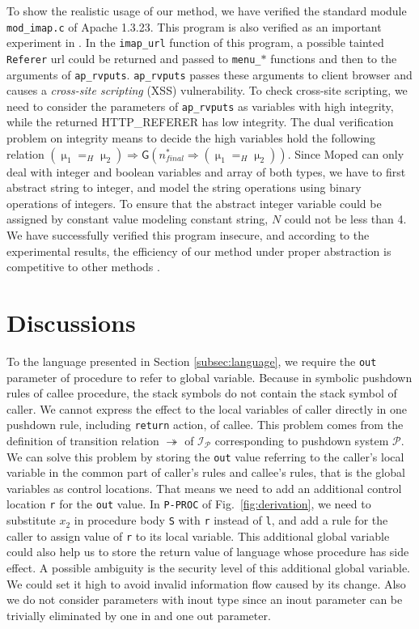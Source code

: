 \documentclass{llncs}
\begin{document}
To show the realistic usage of our method, we have verified the
standard module \texttt{mod\_imap.c} of Apache 1.3.23. This program
is also verified as an important experiment in
\cite{DBLP:conf/pldi/UnnoKY06}. In the \texttt{imap\_url} function
of this program, a possible tainted \texttt{Referer} url could be
returned and passed to \texttt{menu\_$\ast$} functions and then to
the arguments of \texttt{ap\_rvputs}. \texttt{ap\_rvputs} passes
these arguments to client browser and causes a \emph{cross-site
scripting} (XSS) vulnerability. To check cross-site scripting, we
need to consider the parameters of \texttt{ap\_rvputs} as variables
with \textsf{high} integrity, while the returned HTTP\_REFERER has
\textsf{low} integrity. The dual verification problem on integrity
means to decide the \textsf{high} variables hold the following
relation $(\upmu_1 =_H \upmu_2)\Rightarrow
\textsf{G}(n_{final}^*\Rightarrow (\upmu_1 =_H \upmu_2))$. Since
Moped can only deal with integer and boolean variables and array of
both types, we have to first abstract string to integer, and model
the string operations using binary operations of integers. To ensure
that the abstract integer variable could be assigned by constant
value modeling constant string, $N$ could not be less than 4. We
have successfully verified this program insecure, and according to
the experimental results, the efficiency of our method under proper
abstraction is competitive to other methods
\cite{DBLP:conf/pldi/UnnoKY06}.

\section{\label{sec:discuss}Discussions}
To the language presented in Section \ref{subsec:language}, we
require the \texttt{out} parameter of procedure to refer to global
variable. Because in symbolic pushdown rules of callee procedure,
the stack symbols do not contain the stack symbol of caller. We
cannot express the effect to the local variables of caller directly
in one pushdown rule, including \texttt{return} action, of callee.
This problem comes from the definition of transition relation
$\twoheadrightarrow $ of $\mathcal {I}_{\mathcal {P}}$ corresponding
to pushdown system $\mathcal {P}$. We can solve this problem by
storing the \texttt{out} value referring to the caller's local
variable in the common part of caller's rules and callee's rules,
that is the global variables as control locations. That means we
need to add an additional control location \texttt{r} for the
\texttt{out} value. In \texttt{P-PROC} of Fig.~\ref{fig:derivation},
we need to substitute \texttt{$x_2$} in procedure body \texttt{S}
with \texttt{r} instead of \texttt{l}, and add a rule for the caller
to assign value of \texttt{r} to its local variable. This additional
global variable could also help us to store the return value of
language whose procedure has side effect. A possible ambiguity is
the security level of this additional global variable. We could set
it \textsf{high} to avoid invalid information flow caused by its
change. Also we do not consider parameters with \textsf{inout} type
since an \textsf{inout} parameter can be trivially eliminated by one
\textsf{in} and one \textsf{out} parameter.
\end{document}
